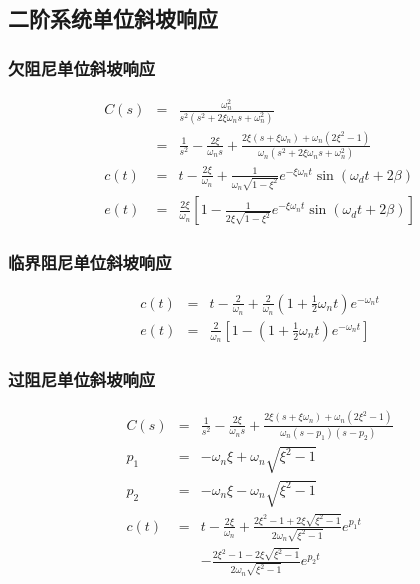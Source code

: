 \documentclass{article}
\begin{document}
\subsection{二阶系统单位斜坡响应}
\label{sec-1-4}
\begin{frame}
\frametitle{欠阻尼单位斜坡响应}
\label{sec-1-4-1}

\begin{eqnarray*}
C(s) & =& \frac{\omega_n^2}{s^2(s^2+2\xi\omega_n s+\omega_n^2)}\\
&=&\frac{1}{s^2}-\frac{2\xi}{\omega_n s}+\frac{2\xi(s+\xi\omega_n)+\omega_n(2\xi^2-1)}{\omega_n(s^2+2\xi\omega_n s+\omega_n^2)}\\
c(t)&=&t-\frac{2\xi}{\omega_n}+\frac{1}{\omega_n\sqrt{1-\xi^2}}e^{-\xi\omega_n t}\sin(\omega_d t+2\beta)\\
e(t)&=&\frac{2\xi}{\omega_n}\left[1-\frac{1}{2\xi\sqrt{1-\xi^2}}e^{-\xi\omega_n t}\sin(\omega_d t+2\beta)\right]
\end{eqnarray*}
\end{frame}
\begin{frame}
\frametitle{临界阻尼单位斜坡响应}
\label{sec-1-4-2}

\begin{eqnarray*}
c(t) & =& t-\frac{2}{\omega_n}+\frac{2}{\omega_n}(1+\frac{1}{2}\omega_n t)e^{-\omega_n t} \\
e(t) &=& \frac{2}{\omega_n}\left[1-(1+\frac{1}{2}\omega_n t)e^{-\omega_n t}\right] 
\end{eqnarray*}
\end{frame}
\begin{frame}
\frametitle{过阻尼单位斜坡响应}
\label{sec-1-4-3}

\begin{eqnarray*}
C(s) &= &\frac{1}{s^2}-\frac{2\xi}{\omega_n s}+\frac{2\xi(s+\xi\omega_n)+\omega_n(2\xi^2-1)}{\omega_n(s-p_1)(s-p_2)} \\
p_1 &=& -\omega_n\xi+\omega_n\sqrt{\xi^2-1} \\
p_2 &=& -\omega_n\xi-\omega_n\sqrt{\xi^2-1} \\
c(t) &=& t-\frac{2\xi}{\omega_n}+\frac{2\xi^2-1+2\xi\sqrt{\xi^2-1}}{2\omega_n\sqrt{\xi^2-1}}e^{p_1 t} \\
     & & -\frac{2\xi^2-1-2\xi\sqrt{\xi^2-1}}{2\omega_n\sqrt{\xi^2-1}}e^{p_2 t} 
\end{eqnarray*}
\end{frame}
\end{document}
